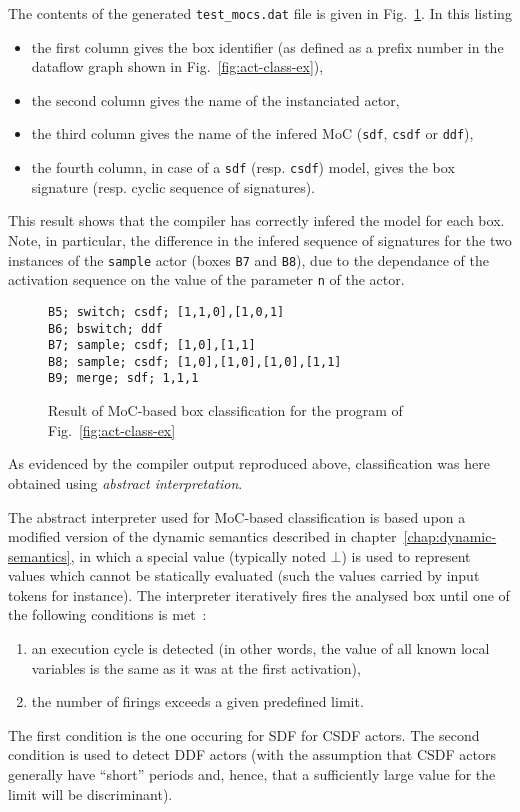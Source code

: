 The contents of the generated \verb|test_mocs.dat| file is given in Fig.~\ref{fig:act-class-res}. In
this listing 
\begin{itemize}
\item the first column gives the box identifier (as defined as a prefix number in the dataflow graph
  shown in Fig.~\ref{fig:act-class-ex}),
\item the second column gives the name of the instanciated actor,
\item the third column gives the name of the  infered MoC (\verb|sdf|, \verb|csdf| or \verb|ddf|),
\item the fourth column, in case of a \verb|sdf| (resp. \verb|csdf|) model, gives the box signature
  (resp. cyclic sequence of signatures).
\end{itemize}
This result shows that the compiler has correctly infered the model for each box. Note, in
particular, the difference in the infered sequence of signatures for the two instances of
the \verb|sample| actor (boxes \verb|B7| and \verb|B8|), due to the dependance of the activation
sequence on the value of the parameter \verb|n| of the actor.

\begin{figure}[H]
  \centering
\begin{verbatim}
B5; switch; csdf; [1,1,0],[1,0,1]
B6; bswitch; ddf
B7; sample; csdf; [1,0],[1,1]
B8; sample; csdf; [1,0],[1,0],[1,0],[1,1]
B9; merge; sdf; 1,1,1
\end{verbatim}
  \caption{Result of MoC-based box classification for the program of Fig.~\ref{fig:act-class-ex}}
  \label{fig:act-class-res}
\end{figure}

As evidenced by the compiler output reproduced above, classification was here obtained 
using \emph{abstract interpretation}.

The abstract interpreter used for MoC-based classification is based upon a modified version of
the dynamic semantics described in chapter~\ref{chap:dynamic-semantics}, in which a special value 
(typically noted $\bot$) is used to represent values which cannot be statically evaluated (such
the values carried by input tokens for instance). The interpreter iteratively fires the analysed box 
until one of the following conditions is met~:
  \begin{enumerate}
  \item an execution cycle is detected (in other words, the value of all known local variables is
    the same as it was at the first activation),
  \item the number of firings exceeds a given predefined limit.
  \end{enumerate}
The first condition is the one occuring for SDF for CSDF actors. The second condition is used to
detect DDF actors (with the assumption that CSDF actors generally have ``short'' periods and, hence,
that a sufficiently large value for the limit will be discriminant).  


